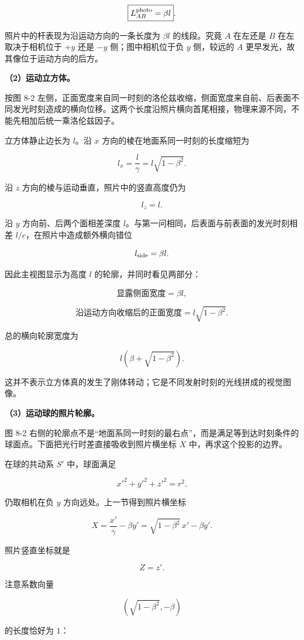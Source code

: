 \documentclass[12pt,a4paper,UTF8]{ctexart}
\begin{document}
\[\boxed{L_{AB}^{\rm photo}=\beta l}.\]

照片中的杆表现为沿运动方向的一条长度为 \(\beta l\) 的线段。究竟 \(A\)
在左还是 \(B\) 在左取决于相机位于 \(+y\) 还是 \(-y\) 侧；图中相机位于负
\(y\) 侧，较远的 \(A\) 更早发光，故其像位于运动方向的后方。

\textbf{（2）运动立方体。}

按图 8-2
左侧，正面宽度来自同一时刻的洛伦兹收缩，侧面宽度来自前、后表面不同发光时刻造成的横向位移。这两个长度沿照片横向首尾相接，物理来源不同，不能先相加后统一乘洛伦兹因子。

立方体静止边长为 \(l\)。沿 \(x\) 方向的棱在地面系同一时刻的长度缩短为

\[l_x=\frac l\gamma=l\sqrt{1-\beta^2}.\]

沿 \(z\) 方向的棱与运动垂直，照片中的竖直高度仍为

\[l_z=l.\]

沿 \(y\) 方向前、后两个面相差深度
\(l\)。与第一问相同，后表面与前表面的发光时刻相差
\(l/c\)，在照片中造成额外横向错位

\[l_{\rm side}=\beta l.\]

因此主视图显示为高度 \(l\) 的轮廓，并同时看见两部分：

\[\boxed{\text{显露侧面宽度}=\beta l},\]

\[\boxed{\text{沿运动方向收缩后的正面宽度}=l\sqrt{1-\beta^2}}.\]

总的横向轮廓宽度为

\[\boxed{l\left(\beta+\sqrt{1-\beta^2}\right)}.\]

这并不表示立方体真的发生了刚体转动；它是不同发射时刻的光线拼成的视觉图像。

\textbf{（3）运动球的照片轮廓。}

图 8-2
右侧的轮廓点不是``地面系同一时刻的最右点''，而是满足等到达时刻条件的球面点。下面把光行时差直接吸收到照片横坐标
\(X\) 中，再求这个投影的边界。

在球的共动系 \(S'\) 中，球面满足

\[x'^2+y'^2+z'^2=r^2.\]

仍取相机在负 \(y\) 方向远处。上一节得到照片横坐标

\[X=\frac{x'}\gamma-\beta y'
=\sqrt{1-\beta^2}\,x'-\beta y'.\]

照片竖直坐标就是

\[Z=z'.\]

注意系数向量

\[\left(\sqrt{1-\beta^2},-\beta\right)\]

的长度恰好为 \(1\)：
\end{document}

